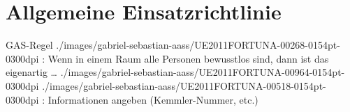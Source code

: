 











\clearpage %
\section{Allgemeine Einsatzrichtlinie}
\label{topic:einsatzrichtlinie}



\begin{PictureSeriesWide}{}{GAS-Regel
}
{./images/gabriel-sebastian-aass/UE2011FORTUNA-00268-0154pt-0300dpi}
{: Wenn in
einem Raum alle Personen bewusstlos sind, dann ist das
eigenartig \ldots }
{./images/gabriel-sebastian-aass/UE2011FORTUNA-00964-0154pt-0300dpi}
{
}
{./images/gabriel-sebastian-aass/UE2011FORTUNA-00518-0154pt-0300dpi}
{:
Informationen angeben (Kemmler-Nummer, etc.)
}
{}
{}
\end{PictureSeriesWide}




